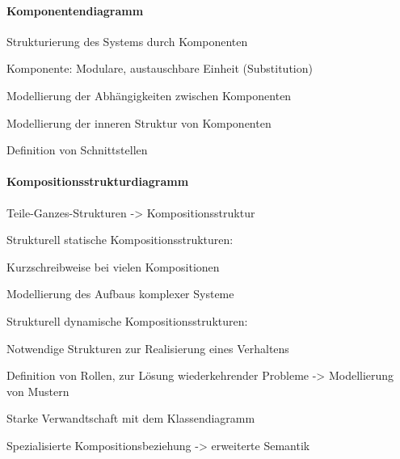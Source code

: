 \documentclass[a4paper]{article}
\begin{document}
\begin{multicols}{3}
  \paragraph{Komponentendiagramm}
  \begin{itemize*}
    \item Strukturierung des Systems durch Komponenten
    \item Komponente: Modulare, austauschbare Einheit (Substitution)
    \item Modellierung der Abhängigkeiten zwischen Komponenten
    \item Modellierung der inneren Struktur von Komponenten
    \item Definition von Schnittstellen
  \end{itemize*}

  \paragraph{Kompositionsstrukturdiagramm}
  \begin{itemize*}
    \item Teile-Ganzes-Strukturen -> Kompositionsstruktur
    \item Strukturell statische Kompositionsstrukturen:
          \begin{itemize*}
            \item Kurzschreibweise bei vielen Kompositionen
            \item Modellierung des Aufbaus komplexer Systeme
          \end{itemize*}
    \item Strukturell dynamische Kompositionsstrukturen:
          \begin{itemize*}
            \item Notwendige Strukturen zur Realisierung eines Verhaltens
            \item Definition von Rollen, zur Lösung wiederkehrender Probleme -> Modellierung von Mustern
          \end{itemize*}
    \item Starke Verwandtschaft mit dem Klassendiagramm
    \item Spezialisierte Kompositionsbeziehung -> erweiterte Semantik
  \end{itemize*}


\end{multicols}
\end{document}
